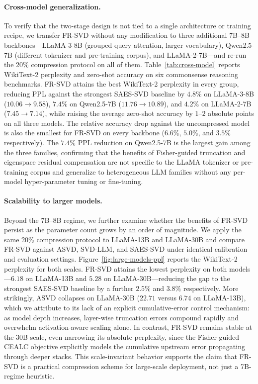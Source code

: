 \documentclass[a4paper,fleqn]{cas-dc}
\begin{document}
\paragraph{Cross-model generalization.}
To verify that the two-stage design is not tied to a single architecture or training recipe, we transfer FR-SVD without any modification to three additional 7B--8B backbones---LLaMA-3-8B (grouped-query attention, larger vocabulary), Qwen2.5-7B (different tokenizer and pre-training corpus), and LLaMA-2-7B---and re-run the 20\% compression protocol on all of them. Table~\ref{tab:cross-model} reports WikiText-2 perplexity and zero-shot accuracy on six commonsense reasoning benchmarks. FR-SVD attains the best WikiText-2 perplexity in every group, reducing PPL against the strongest SAES-SVD baseline by $4.8\%$ on LLaMA-3-8B ($10.06\!\to\!9.58$), $7.4\%$ on Qwen2.5-7B ($11.76\!\to\!10.89$), and $4.2\%$ on LLaMA-2-7B ($7.45\!\to\!7.14$), while raising the average zero-shot accuracy by $1$--$2$ absolute points on all three models. The relative accuracy drop against the uncompressed model is also the smallest for FR-SVD on every backbone ($6.6\%$, $5.0\%$, and $3.5\%$ respectively). The $7.4\%$ PPL reduction on Qwen2.5-7B is the largest gain among the three families, confirming that the benefits of Fisher-guided truncation and eigenspace residual compensation are not specific to the LLaMA tokenizer or pre-training corpus and generalize to heterogeneous LLM families without any per-model hyper-parameter tuning or fine-tuning.



\paragraph{Scalability to larger models.}
Beyond the 7B--8B regime, we further examine whether the benefits of FR-SVD persist as the parameter count grows by an order of magnitude. We apply the same 20\% compression protocol to LLaMA-13B and LLaMA-30B and compare FR-SVD against ASVD, SVD-LLM, and SAES-SVD under identical calibration and evaluation settings. Figure~\ref{fig:large-models-ppl} reports the WikiText-2 perplexity for both scales. FR-SVD attains the lowest perplexity on both models---$6.18$ on LLaMA-13B and $5.28$ on LLaMA-30B---reducing the gap to the strongest SAES-SVD baseline by a further $2.5\%$ and $3.8\%$ respectively. More strikingly, ASVD collapses on LLaMA-30B ($22.71$ versus $6.74$ on LLaMA-13B), which we attribute to its lack of an explicit cumulative-error control mechanism: as model depth increases, layer-wise truncation errors compound rapidly and overwhelm activation-aware scaling alone. In contrast, FR-SVD remains stable at the 30B scale, even narrowing its absolute perplexity, since the Fisher-guided CEALC objective explicitly models the cumulative upstream error propagating through deeper stacks. This scale-invariant behavior supports the claim that FR-SVD is a practical compression scheme for large-scale deployment, not just a 7B-regime heuristic.
\end{document}
